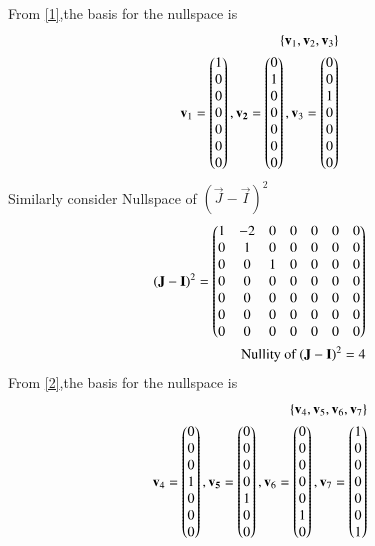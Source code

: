 \documentclass[journal,12pt,twocolumn]{IEEEtran}
\begin{document}
From \eqref{1},the basis for the nullspace is
\begin{align}
    \left\{\mathbf{v}_1,\mathbf{v}_2,\mathbf{v}_3\right\}\\
    \mathbf{v}_1=\begin{pmatrix}1\\0\\0\\0\\0\\0\\0\end{pmatrix},\mathbf{v_2}=\begin{pmatrix}0\\1\\0\\0\\0\\0\\0\end{pmatrix},\mathbf{v}_3=\begin{pmatrix}0\\0\\1\\0\\0\\0\\0\end{pmatrix}
\end{align}
Similarly consider Nullspace of $(\vec{J}-\vec{I})^2$ 
\begin{align}
  (\mathbf{J}-\mathbf{I})^2=\begin{pmatrix}1&-2&0&0&0&0&0\\0&1&0&0&0&0&0\\0&0&1&0&0&0&0\\0&0&0&0&0&0&0\\0&0&0&0&0&0&0\\0&0&0&0&0&0&0\\0&0&0&0&0&0&0\end{pmatrix}  \label{2}\\
   \text{Nullity of }  (\mathbf{J}-\mathbf{I})^2=4
\end{align}
From \eqref{2},the basis for the nullspace is
\begin{align}
    \left\{\mathbf{v}_4,\mathbf{v}_5,\mathbf{v}_6,\mathbf{v}_7\right\}\\
    \mathbf{v}_4=\begin{pmatrix}0\\0\\0\\1\\0\\0\\0\end{pmatrix},\mathbf{v_5}=\begin{pmatrix}0\\0\\0\\0\\1\\0\\0\end{pmatrix},\mathbf{v}_6=\begin{pmatrix}0\\0\\0\\0\\0\\1\\0\end{pmatrix},\mathbf{v}_7=\begin{pmatrix}1\\0\\0\\0\\0\\0\\1\end{pmatrix}
\end{align}
\end{document}
